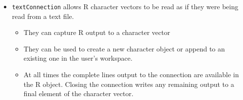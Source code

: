 \documentclass[]{book}
\providecommand{\tightlist}{%
  \setlength{\itemsep}{0pt}\setlength{\parskip}{0pt}}
\begin{document}
\begin{itemize}
\tightlist
\item
  \texttt{textConnection} allows R character vectors to be read as if they were being read from a text file.

  \begin{itemize}
  \tightlist
  \item
    They can capture R output to a character vector
  \item
    They can be used to create a new character object or append to an existing one in the user's workspace.
  \item
    At all times the complete lines output to the connection are available in the R object. Closing the connection writes any remaining output to a final element of the character vector.
  \end{itemize}
\end{itemize}
\end{document}
